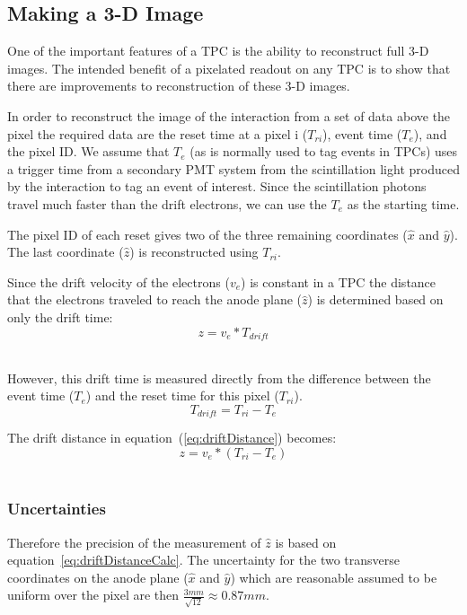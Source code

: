 \subsection{Making a 3-D Image}

One of the important features of a TPC is the ability to reconstruct full 3-D images.
The intended benefit of a pixelated readout on any TPC is to show that there are improvements to reconstruction of these 3-D images.

In order to reconstruct the image of the interaction from a set of data above the pixel the required data are the reset time at a pixel i ($T_{ri}$), event time ($T_{e}$), and the pixel ID.
We assume that $T_{e}$ (as is normally used to tag events in TPCs) uses a trigger time from a secondary PMT system from the scintillation light produced by the interaction to tag an event of interest.
Since the scintillation photons travel much faster than the drift electrons, we can use the $T_{e}$ as the starting time.

The pixel ID of each reset gives two of the three remaining coordinates ($\hat{x}$ and $\hat{y}$).
The last coordinate ($\hat{z}$) is reconstructed using $T_{ri}$.

Since the drift velocity of the electrons ($v_{e}$) is constant in a TPC the distance that the electrons traveled to reach the anode plane ($\hat{z}$) is determined based on only the drift time:
\begin{equation}
  z = v_{e} * T_{drift}
\end{equation}~\label{eq:driftDistance}

However, this drift time is measured directly from the difference between the event time ($T_{e}$) and the reset time for this pixel ($T_{ri}$).
\begin{equation}
  T_{drift} = T_{ri} - T_{e}
\end{equation}

The drift distance in equation~(\ref{eq:driftDistance}) becomes:
\begin{equation}
  z = v_{e} * (T_{ri} - T_{e})
\end{equation}~\label{eq:driftDistanceCalc}

\subsubsection{Uncertainties}

Therefore the precision of the measurement of $\hat{z}$ is based on equation~\ref{eq:driftDistanceCalc}.
The uncertainty for the two transverse coordinates on the anode plane ($\hat{x}$ and $\hat{y}$) which are reasonable assumed to be uniform over the pixel are then $\frac{3 mm}{\sqrt{12}} \approx 0.87 mm$.


